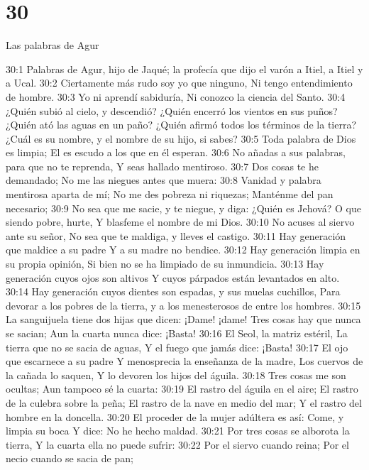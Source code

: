 \chapter{30}

Las palabras de Agur  

30:1 Palabras de Agur, hijo de Jaqué; la profecía que dijo el varón a Itiel, a Itiel y a Ucal.  
30:2 Ciertamente más rudo soy yo que ninguno,  
Ni tengo entendimiento de hombre.  
30:3 Yo ni aprendí sabiduría, 
Ni conozco la ciencia del Santo.  
30:4 ¿Quién subió al cielo, y descendió?  
¿Quién encerró los vientos en sus puños?  
¿Quién ató las aguas en un paño?  
¿Quién afirmó todos los términos de la tierra?  
¿Cuál es su nombre, y el nombre de su hijo, si sabes?  
30:5 Toda palabra de Dios es limpia;  
El es escudo a los que en él esperan.  
30:6 No añadas a sus palabras, para que no te reprenda,  
Y seas hallado mentiroso.  
30:7 Dos cosas te he demandado;  
No me las niegues antes que muera:  
30:8 Vanidad y palabra mentirosa aparta de mí;  
No me des pobreza ni riquezas;  
Manténme del pan necesario;  
30:9 No sea que me sacie, y te niegue, y diga: ¿Quién es Jehová?  
O que siendo pobre, hurte,  
Y blasfeme el nombre de mi Dios.  
30:10 No acuses al siervo ante su señor, 
No sea que te maldiga, y lleves el castigo.  
30:11 Hay generación que maldice a su padre  
Y a su madre no bendice.  
30:12 Hay generación limpia en su propia opinión,  
Si bien no se ha limpiado de su inmundicia.  
30:13 Hay generación cuyos ojos son altivos  
Y cuyos párpados están levantados en alto.  
30:14 Hay generación cuyos dientes son espadas, y sus muelas cuchillos,  
Para devorar a los pobres de la tierra, y a los menesterosos de entre los hombres.  
30:15 La sanguijuela tiene dos hijas que dicen: ¡Dame! ¡dame!  
Tres cosas hay que nunca se sacian;  
Aun la cuarta nunca dice: ¡Basta!  
30:16 El Seol, la matriz estéril,  
La tierra que no se sacia de aguas,  
Y el fuego que jamás dice: ¡Basta!  
30:17 El ojo que escarnece a su padre  
Y menosprecia la enseñanza de la madre,  
Los cuervos de la cañada lo saquen,  
Y lo devoren los hijos del águila.  
30:18 Tres cosas me son ocultas;  
Aun tampoco sé la cuarta:  
30:19 El rastro del águila en el aire;  
El rastro de la culebra sobre la peña;  
El rastro de la nave en medio del mar;  
Y el rastro del hombre en la doncella.  
30:20 El proceder de la mujer adúltera es así:  
Come, y limpia su boca  
Y dice: No he hecho maldad.  
30:21 Por tres cosas se alborota la tierra,  
Y la cuarta ella no puede sufrir:  
30:22 Por el siervo cuando reina;  
Por el necio cuando se sacia de pan;  
